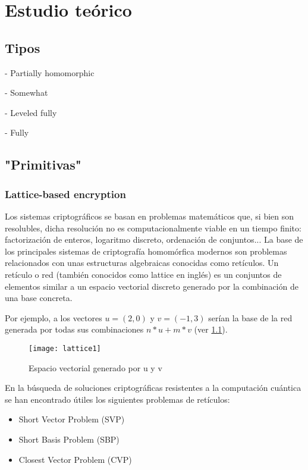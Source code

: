 \chapter{Estudio teórico}

\section{Tipos}

- Partially homomorphic

- Somewhat

- Leveled fully

- Fully

\section{"Primitivas"}

\subsection{Lattice-based encryption}

Los sistemas criptográficos se basan en problemas matemáticos que, si bien son resolubles, dicha resolución no es computacionalmente viable en un tiempo finito: factorización de enteros, logaritmo discreto, ordenación de conjuntos... La base de los principales sistemas de criptografía homomórfica modernos son problemas relacionados con unas estructuras algebraicas conocidas como retículos. Un retículo o red (también conocidos como lattice en inglés) es un conjuntos de elementos similar a un espacio vectorial discreto generado por la combinación de una base concreta.

Por ejemplo, a los vectores $u = (2, 0)$ y $v = (-1, 3)$ serían la base de la red generada por todas sus combinaciones $n*u + m*v$ (ver \ref{fig:lattice1}).

\begin{figure}[h]
  \caption{Espacio vectorial generado por u y v}
  \label{fig:lattice1}
  \texttt{[image: lattice1]}
\end{figure}

En la búsqueda de soluciones criptográficas resistentes a la computación cuántica se han encontrado útiles los siguientes problemas\cite{wickr_what_2018} de retículos:

\begin{itemize}
  \item Short Vector Problem (SVP)
  \item Short Basis Problem (SBP)
  \item Closest Vector Problem (CVP)
\end{itemize}

